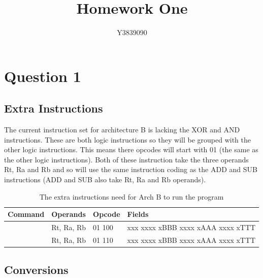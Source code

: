 \documentclass[11pt]{article}
\title{Homework One}
\author{Y3839090}
\begin{document}
    
	\maketitle
	
	\tableofcontents %
	\listoffigures %
	\newpage

	\section{Question 1}
		\subsection{Extra Instructions}
        
        The current instruction set for architecture B is lacking the XOR and AND instructions. These are both logic instructions so they will be grouped with the other logic instructions. This means there opcodes will start with 01 (the same as the other logic instructions). Both of these instruction take the three operands Rt, Ra and Rb and so will use the same instruction coding as the ADD and SUB instructions (ADD and SUB also take Rt, Ra and Rb operands).
        
\begin{table}[ht]
\centering
\caption{The extra instructions need for Arch B to run the program}
\label{table:extrainstructions}
\begin{tabular}{l|lll}
\rowcolor[HTML]{417CB4} 
{\color[HTML]{FFFFFF} \textbf{Command}} & {\color[HTML]{FFFFFF} \textbf{Operands}} & {\color[HTML]{FFFFFF} \textbf{Opcode}} & {\color[HTML]{FFFFFF} \textbf{Fields}} \\ \hline
\rowcolor[HTML]{C4D9E1} 
\cellcolor[HTML]{417CB4}{\color[HTML]{FFFFFF} and} & Rt, Ra, Rb & 01 100 & xxx xxxx xBBB xxxx xAAA xxxx xTTT \\
\rowcolor[HTML]{DBE5E8} 
\cellcolor[HTML]{417CB4}{\color[HTML]{FFFFFF} xor} & Rt, Ra, Rb & 01 110 & xxx xxxx xBBB xxxx xAAA xxxx xTTT
\end{tabular}
\end{table}

		\subsection{Conversions}
        
\end{document}
